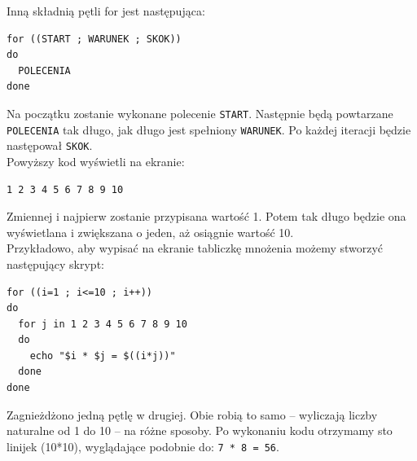 %

Inną składnią pętli for jest następująca:
\begin{verbatim}
for ((START ; WARUNEK ; SKOK))	
do	
  POLECENIA	
done
\end{verbatim}
Na początku zostanie wykonane polecenie \texttt{START}. Następnie będą powtarzane \texttt{POLECENIA} tak długo, jak długo jest spełniony \texttt{WARUNEK}. Po każdej iteracji będzie następował \texttt{SKOK}.\\

Powyższy kod wyświetli na ekranie:
\begin{verbatim}
1 2 3 4 5 6 7 8 9 10
\end{verbatim}
Zmiennej i najpierw zostanie przypisana wartość 1. Potem tak długo będzie ona wyświetlana i zwiększana o jeden, aż osiągnie wartość 10.\\

Przykładowo, aby wypisać na ekranie tabliczkę mnożenia możemy stworzyć następujący skrypt:
\begin{verbatim}
for ((i=1 ; i<=10 ; i++))	
do	
  for j in 1 2 3 4 5 6 7 8 9 10	
  do	
    echo "$i * $j = $((i*j))"	
  done	
done
\end{verbatim}
Zagnieżdżono jedną pętlę w drugiej. Obie robią to samo – wyliczają liczby naturalne od 1 do 10 – na różne sposoby. Po wykonaniu kodu otrzymamy sto linijek (10*10), wyglądające podobnie do: \texttt{7 * 8 = 56}.

